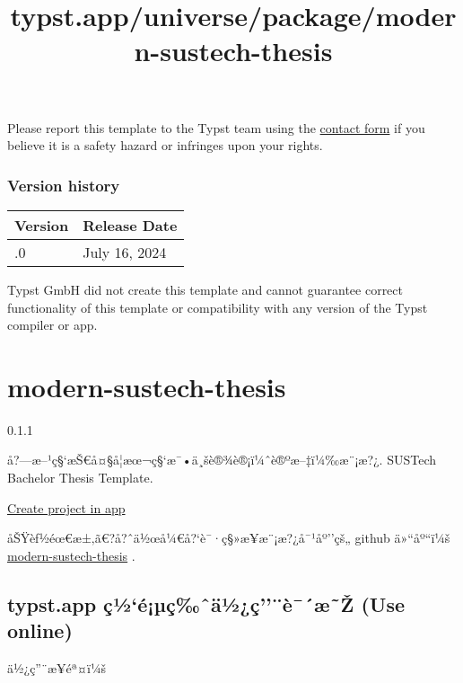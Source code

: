 Please report this template to the Typst team using the
\href{https://typst.app/contact}{contact form} if you believe it is a
safety hazard or infringes upon your rights.

\label{versions}
\subsubsection{Version history}\label{version-history}

\begin{longtable}[]{@{}ll@{}}
\toprule\noalign{}
Version & Release Date \\
\midrule\noalign{}
\endhead
\bottomrule\noalign{}
\endlastfoot
0.1.0 & July 16, 2024 \\
\end{longtable}

Typst GmbH did not create this template and cannot guarantee correct
functionality of this template or compatibility with any version of the
Typst compiler or app.


\title{typst.app/universe/package/modern-sustech-thesis}

\label{banner}
\label{template-thumbnail}

\section{modern-sustech-thesis}\label{modern-sustech-thesis}

{ 0.1.1 }

å?---æ--¹ç§`æŠ€å¤§å­¦æœ¬ç§`æ¯•ä¸šè®¾è®¡ï¼ˆè®ºæ--‡ï¼‰æ¨¡æ?¿. SUSTech
Bachelor Thesis Template.

\href{/app?template=modern-sustech-thesis&version=0.1.1}{Create project
in app}

\label{readme}
åŠŸèƒ½éœ€æ±‚ã€?å?ˆä½œå¼€å?{}`è¯·ç§»æ­¥æ¨¡æ?¿å¯¹åº''çš„ github ä»``åº``ï¼š
\href{https://github.com/Duolei-Wang/modern-sustech-thesis}{modern-sustech-thesis}
.

\subsection{typst.app ç½`é¡µç‰ˆä½¿ç''¨è¯´æ˜Ž (Use
online)}\label{typst.app-uxe7uxbduxe9uxb5uxe7ux2c6uxe4uxbduxe7uxe8uxe6ux17e-use-online}

ä½¿ç''¨æ­¥éª¤ï¼š

